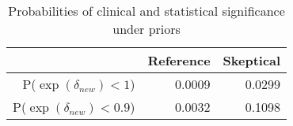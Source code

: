 \begin{table}[htbp]
\centering
\begin{tabular}{rrr}
  \hline
 & Reference & Skeptical \\ 
  \hline
P($\exp(\delta_{new}) < 1$) & 0.0009 & 0.0299 \\ 
  P($\exp(\delta_{new}) < 0.9$) & 0.0032 & 0.1098 \\ 
   \hline
\end{tabular}
\caption{Probabilities of clinical and statistical significance under priors} 
\label{tab:prob_sigs}
\end{table}

